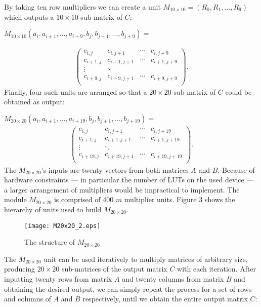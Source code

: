 \documentclass[11pt,twoside]{article}
\begin{document}
By taking ten row multipliers we can create a unit $M_{10 \times 10}=(R_{0},R_{1},\ldots,R_{9})$ which outputs a $10 \times 10$ sub-matrix of $C$:

\newpage
$M_{10 \times 10}(a_{i},a_{i+1},\ldots,a_{i+9},b_{j},b_{j+1},\ldots,b_{j+9})=$

\begin{align*}
\left(
\begin{matrix}
c_{i,j} & c_{i,j+1} & \cdots & c_{i,j+9} \\
c_{i+1,j} & c_{i+1,j+1} & \cdots & c_{i+1,j+9} \\
\vdots & \ddots \\
c_{i+9,j} & c_{i+9,j+1} & \cdots & c_{i+9,j+9} \\
\end{matrix}
\right).
\end{align*}
Finally, four such units are arranged so that a $20 \times 20$ sub-matrix of $C$ could be obtained as output:

$M_{20 \times 20}(a_{i},a_{i+1},\ldots,a_{i+19},b_{j},b_{j+1},\ldots,b_{j+19})=$
\begin{align*}
\left(
\begin{matrix}
c_{i,j} & c_{i,j+1} & \cdots & c_{i,j+19} \\
c_{i+1,j} & c_{i+1,j+1} & \cdots & c_{i+1,j+19} \\
\vdots & \ddots \\
c_{i+19,j} & c_{i+19,j+1} & \cdots & c_{i+19,j+19} \\
\end{matrix}
\right).
\end{align*}
The $M_{20 \times 20}$'s inputs are twenty vectors from both matrices $A$ and $B$.
Because of hardware constraints --- in particular the number of LUTs on the used device --- a larger arrangement of multipliers would be impractical to implement. The module $M_{20 \times 20}$ is comprised of 400 $m$ multiplier units. Figure 3 shows the hierarchy of units used to build $M_{20 \times 20}$.

\begin{figure}[h!]
\centering
\texttt{[image: M20x20\_2.eps]}
\caption{The structure of $M_{20 \times 20}$}
\end{figure}

The $M_{20 \times 20}$ unit can be used iteratively to multiply matrices of arbitrary size, producing $20 \times 20$ sub-matrices of the output matrix $C$ with each iteration. After inputting twenty rows from matrix $A$ and twenty columns from matrix $B$ and obtaining the desired output, we can simply repeat the process for a set of rows and columns of $A$ and $B$ respectively, until we obtain the entire output matrix $C$:
\end{document}
